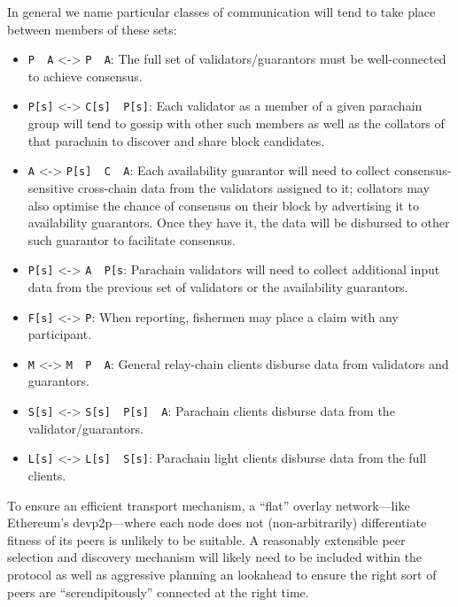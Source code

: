 \documentclass[9pt,oneside]{amsart}
\begin{document}
\begin{multicols}{2}
 In general we name particular classes of communication will tend to take place between members of these sets:

\begin{itemize}
\item \texttt{P\ \textbar{}\ A} \textless{}-\textgreater{} \texttt{P\ \textbar{}\ A}: The full set of validators/guarantors must be well-connected to achieve consensus.
\item \texttt{P{[}s{]}} \textless{}-\textgreater{} \texttt{C{[}s{]}\ \textbar{}\ P{[}s{]}}: Each validator as a member of a given parachain group will tend to gossip with other such members as well as the collators of that parachain to discover and share block candidates.
\item \texttt{A} \textless{}-\textgreater{} \texttt{P{[}s{]}\ \textbar{}\ C\ \textbar{}\ A}: Each availability guarantor will need to collect consensus-sensitive cross-chain data from the validators assigned to it; collators may also optimise the chance of consensus on their block by advertising it to availability guarantors. Once they have it, the data will be disbursed to other such guarantor to facilitate consensus.
\item \texttt{P{[}s{]}} \textless{}-\textgreater{} \texttt{A\ \textbar{}\ P{[}s\textquotesingle{}{]}}: Parachain validators will need to collect additional input data from the previous set of validators or the availability guarantors.
\item \texttt{F{[}s{]}} \textless{}-\textgreater{} \texttt{P}: When reporting, fishermen may place a claim with any participant.
\item \texttt{M} \textless{}-\textgreater{} \texttt{M\ \textbar{}\ P\ \textbar{}\ A}: General relay-chain clients disburse data from validators and guarantors.
\item \texttt{S{[}s{]}} \textless{}-\textgreater{} \texttt{S{[}s{]}\ \textbar{}\ P{[}s{]}\ \textbar{}\ A}: Parachain clients disburse data from the validator/guarantors.
\item \texttt{L{[}s{]}} \textless{}-\textgreater{} \texttt{L{[}s{]}\ \textbar{}\ S{[}s{]}}: Parachain light clients disburse data from the full clients.
\end{itemize}

 To ensure an efficient transport mechanism, a ``flat'' overlay network---like Ethereum's devp2p---where each node does not (non-arbitrarily) differentiate fitness of its peers is unlikely to be suitable. A reasonably extensible peer selection and discovery mechanism will likely need to be included within the protocol as well as aggressive planning an lookahead to ensure the right sort of peers are ``serendipitously'' connected at the right time.


\end{multicols}
\end{document}
